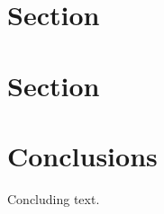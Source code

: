 \documentclass[11pt]{article}
\begin{document}
\section{Section}

\section{Section}

\section{Conclusions}

Concluding text.



\end{document}
